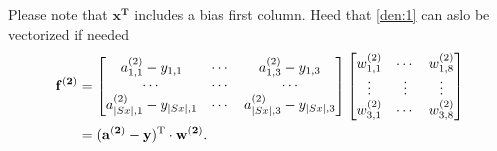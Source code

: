 \documentclass[a4paper,12pt,notitlepage]{article}
\begin{document}
Please note that $\mathbf{x^{T}}$ includes a bias first column. Heed that \eqref{den:1} can aslo be vectorized if needed
\begin{equation}
\begin{split}
\mathbf{f^{(2)}}
&=\begin{bmatrix}
 a_{1,1}^{(2)}-y_{1,1}& \cdots & a_{1,3}^{(2)}-y_{1,3}\\ 
 \cdots &\cdots  & \cdots\\ 
 a_{|Sx|,1}^{(2)}-y_{|Sx|,1}& \cdots & a_{|Sx|,3}^{(2)}-y_{|Sx|,3}
\end{bmatrix}
\begin{bmatrix}
 w_{1,1}^{(2)}& \cdots & w_{1,8}^{(2)}\\ 
 \vdots& \vdots & \vdots\\ 
 w_{3,1}^{(2)}& \cdots & w_{3,8}^{(2)}
\end{bmatrix}\\
&=(\mathbf{a^{(2)}-y})^{\textup{T}}\cdot\mathbf{w^{(2)}}.
\end{split}
\end{equation}
\end{document}
